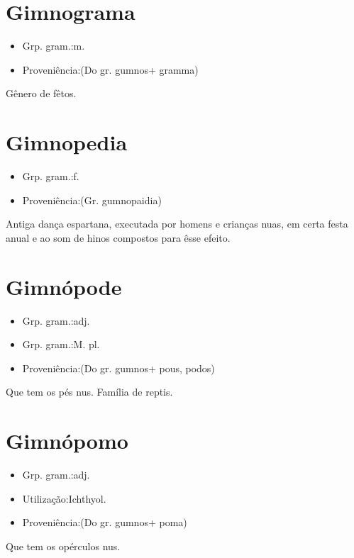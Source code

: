 \section{Gimnograma}
\begin{itemize}
\item {Grp. gram.:m.}
\end{itemize}
\begin{itemize}
\item {Proveniência:(Do gr. \textunderscore gumnos\textunderscore  + \textunderscore gramma\textunderscore )}
\end{itemize}
Gênero de fêtos.
\section{Gimnopedia}
\begin{itemize}
\item {Grp. gram.:f.}
\end{itemize}
\begin{itemize}
\item {Proveniência:(Gr. \textunderscore gumnopaidia\textunderscore )}
\end{itemize}
Antiga dança espartana, executada por homens e crianças nuas, em certa festa anual e ao som de hinos compostos para êsse efeito.
\section{Gimnópode}
\begin{itemize}
\item {Grp. gram.:adj.}
\end{itemize}
\begin{itemize}
\item {Grp. gram.:M. pl.}
\end{itemize}
\begin{itemize}
\item {Proveniência:(Do gr. \textunderscore gumnos\textunderscore  + \textunderscore pous\textunderscore , \textunderscore podos\textunderscore )}
\end{itemize}
Que tem os pés nus.
Família de reptis.
\section{Gimnópomo}
\begin{itemize}
\item {Grp. gram.:adj.}
\end{itemize}
\begin{itemize}
\item {Utilização:Ichthyol.}
\end{itemize}
\begin{itemize}
\item {Proveniência:(Do gr. \textunderscore gumnos\textunderscore  + \textunderscore poma\textunderscore )}
\end{itemize}
Que tem os opérculos nus.
